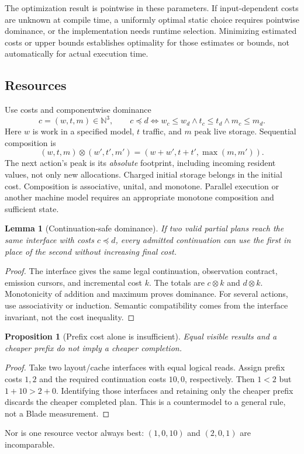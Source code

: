 \documentclass[11pt]{article}
\newtheorem{lemma}[theorem]{Lemma}
\newtheorem{proposition}[theorem]{Proposition}
\newcommand{\Nat}{\mathbb N}
\begin{document}
The optimization result is pointwise in these parameters. If input-dependent costs are unknown at compile time, a uniformly optimal static choice requires pointwise dominance, or the implementation needs runtime selection. Minimizing estimated costs or upper bounds establishes optimality for those estimates or bounds, not automatically for actual execution time.

\subsection{Resources}
Use costs and componentwise dominance
\[
 c=(w,t,m)\in\Nat^3,\qquad
 c\preceq d\iff w_c\le w_d\land t_c\le t_d\land m_c\le m_d.
\]
Here $w$ is work in a specified model, $t$ traffic, and $m$ peak live storage. Sequential composition is
\[
 (w,t,m)\otimes(w',t',m')
   =(w+w',t+t',\max(m,m')).
\]
The next action's peak is its \emph{absolute} footprint, including incoming resident values, not only new allocations. Charged initial storage belongs in the initial cost. Composition is associative, unital, and monotone. Parallel execution or another machine model requires an appropriate monotone composition and sufficient state.

\begin{lemma}[Continuation-safe dominance]
If two valid partial plans reach the same interface with costs $c\preceq d$, every admitted continuation can use the first in place of the second without increasing final cost.
\end{lemma}
\begin{proof}
The interface gives the same legal continuation, observation contract, emission cursors, and incremental cost $k$. The totals are $c\otimes k$ and $d\otimes k$. Monotonicity of addition and maximum proves dominance. For several actions, use associativity or induction. Semantic compatibility comes from the interface invariant, not the cost inequality.
\end{proof}

\begin{proposition}[Prefix cost alone is insufficient]
Equal visible results and a cheaper prefix do not imply a cheaper completion.
\end{proposition}
\begin{proof}
Take two layout/cache interfaces with equal logical reads. Assign prefix costs $1,2$ and the required continuation costs $10,0$, respectively. Then $1<2$ but $1+10>2+0$. Identifying those interfaces and retaining only the cheaper prefix discards the cheaper completed plan. This is a countermodel to a general rule, not a Blade measurement.
\end{proof}
Nor is one resource vector always best: $(1,0,10)$ and $(2,0,1)$ are incomparable.
\end{document}
